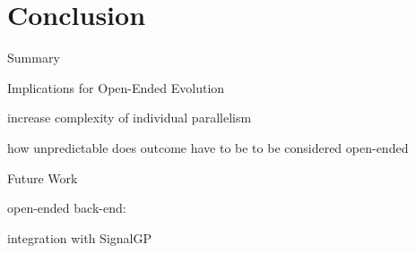 \section{Conclusion}

\begin{frame}{Summary}

\end{frame}

\begin{frame}{Implications for Open-Ended Evolution}

increase complexity of individual
parallelism

how unpredictable does outcome have to be to be considered open-ended

\end{frame}

\begin{frame}{Future Work}

open-ended back-end:

integration with SignalGP \cite{lalejini2018evolving}

\end{frame}
